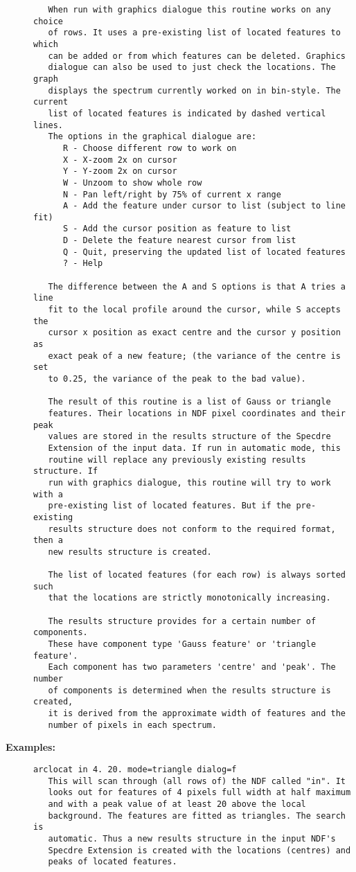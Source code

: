 \begin{description}
\begin{verbatim}
   When run with graphics dialogue this routine works on any choice
   of rows. It uses a pre-existing list of located features to which
   can be added or from which features can be deleted. Graphics
   dialogue can also be used to just check the locations. The graph
   displays the spectrum currently worked on in bin-style. The current
   list of located features is indicated by dashed vertical lines.
   The options in the graphical dialogue are:
      R - Choose different row to work on
      X - X-zoom 2x on cursor
      Y - Y-zoom 2x on cursor
      W - Unzoom to show whole row
      N - Pan left/right by 75% of current x range
      A - Add the feature under cursor to list (subject to line fit)
      S - Add the cursor position as feature to list
      D - Delete the feature nearest cursor from list
      Q - Quit, preserving the updated list of located features
      ? - Help

   The difference between the A and S options is that A tries a line
   fit to the local profile around the cursor, while S accepts the
   cursor x position as exact centre and the cursor y position as
   exact peak of a new feature; (the variance of the centre is set
   to 0.25, the variance of the peak to the bad value).

   The result of this routine is a list of Gauss or triangle
   features. Their locations in NDF pixel coordinates and their peak
   values are stored in the results structure of the Specdre
   Extension of the input data. If run in automatic mode, this
   routine will replace any previously existing results structure. If
   run with graphics dialogue, this routine will try to work with a
   pre-existing list of located features. But if the pre-existing
   results structure does not conform to the required format, then a
   new results structure is created.

   The list of located features (for each row) is always sorted such
   that the locations are strictly monotonically increasing.

   The results structure provides for a certain number of components.
   These have component type 'Gauss feature' or 'triangle feature'.
   Each component has two parameters 'centre' and 'peak'. The number
   of components is determined when the results structure is created,
   it is derived from the approximate width of features and the
   number of pixels in each spectrum.

\end{verbatim}

\item [{\bf Examples:}]
\begin{verbatim}
arclocat in 4. 20. mode=triangle dialog=f
   This will scan through (all rows of) the NDF called "in". It
   looks out for features of 4 pixels full width at half maximum
   and with a peak value of at least 20 above the local
   background. The features are fitted as triangles. The search is
   automatic. Thus a new results structure in the input NDF's
   Specdre Extension is created with the locations (centres) and
   peaks of located features.


\end{verbatim}
\end{description}
